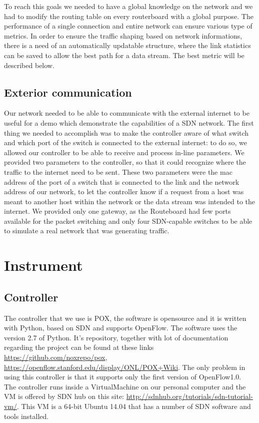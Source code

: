 \documentclass[article,10pt]{IEEEtran}
\begin{document}
To reach this goals we needed to have a global knowledge on the network and we had to modify the routing table on every routerboard with a
global purpose.
The performance of a single connection and entire network can ensure various type of metrics.
In order to ensure the traffic shaping based on network informations, there is a need of an automatically updatable structure,
where the link statistics can be saved to allow the best path for a data stream. 
The best metric will be described below.

\subsection{Exterior communication}
Our network needed to be able to communicate with the external internet to be useful for a demo which demonstrate the capabilities of a SDN network.
The first thing we needed to accomplish was to make the controller aware of what switch and which port of the switch is connected to the external internet:
to do so, we allowed our controller to be able to receive and process in-line parameters. We provided two parameters to the controller, so that
it could recognize where the traffic to the internet need to be sent. These two parameters were the mac address of the
port of a switch that is connected to the link and the network address of our network, to let the controller know if a request from a host was meant to another host
within the network or the data stream was intended to the internet. We provided only one gateway, as the Routeboard had few ports available for the packet switching
and only four SDN-capable switches to be able to simulate a real network that was generating traffic.


\section{Instrument}\label{sec:instrument}
\subsection{Controller}
The controller that we use is POX, the software is opensource and it is written with Python, based on SDN and supports OpenFlow.
The software uses the version 2.7 of Python.
It's repository, together with lot of documentation regarding the project can be found at these links \url{https://github.com/noxrepo/pox}, \url{https://openflow.stanford.edu/display/ONL/POX+Wiki}.
The only problem in using this controller is that it supports only the first version of OpenFlow1.0.
\\
The controller runs inside a VirtualMachine on our personal computer and the VM is offered by SDN hub on this site: \url{http://sdnhub.org/tutorials/sdn-tutorial-vm/}.
This VM is a 64-bit Ubuntu 14.04 that has a number of SDN software and tools installed.
\end{document}
